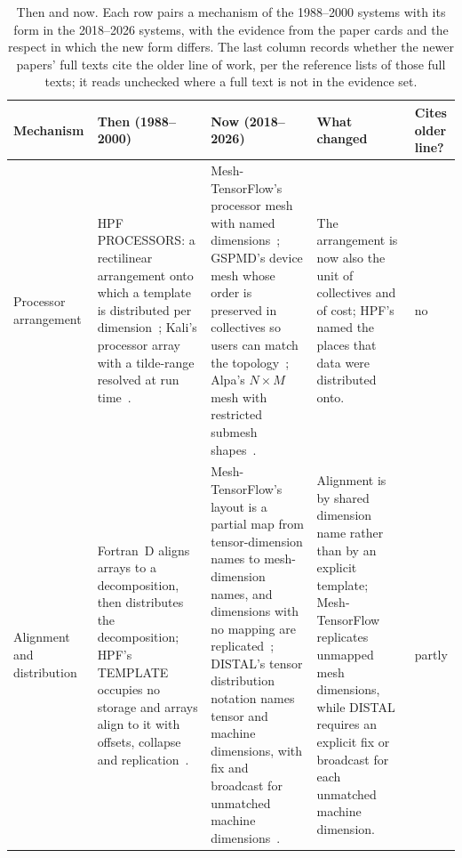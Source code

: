 \begin{table}[t]
\centering
\scriptsize
\caption{Then and now. Each row pairs a mechanism of the 1988--2000 systems with its form in the 2018--2026 systems, with the evidence from the paper cards and the respect in which the new form differs. The last column records whether the newer papers' full texts cite the older line of work, per the reference lists of those full texts; it reads unchecked where a full text is not in the evidence set.}
\label{tab:thennow}
\begin{tabular}{p{}p{}p{}p{}p{}}
\toprule
Mechanism & Then (1988--2000) & Now (2018--2026) & What changed & Cites older line? \\
\midrule
Processor arrangement & HPF PROCESSORS: a rectilinear arrangement onto which a template is distributed per dimension~\cite{loveman1993hpf}; Kali's processor array with a tilde-range resolved at run time~\cite{mehrotra1990kali}. & Mesh-TensorFlow's processor mesh with named dimensions~\cite{shazeer2018meshtf}; GSPMD's device mesh whose order is preserved in collectives so users can match the topology~\cite{xu2021gspmd}; Alpa's $N{\times}M$ mesh with restricted submesh shapes~\cite{zheng2022alpa}. & The arrangement is now also the unit of collectives and of cost; HPF's named the places that data were distributed onto. & no \\
Alignment and distribution & Fortran~D aligns arrays to a decomposition, then distributes the decomposition; HPF's TEMPLATE occupies no storage and arrays align to it with offsets, collapse and replication~\cite{hiranandani1991fortrand,loveman1993hpf}. & Mesh-TensorFlow's layout is a partial map from tensor-dimension names to mesh-dimension names, and dimensions with no mapping are replicated~\cite{shazeer2018meshtf}; DISTAL's tensor distribution notation names tensor and machine dimensions, with fix and broadcast for unmatched machine dimensions~\cite{yadav2022distal}. & Alignment is by shared dimension name rather than by an explicit template; Mesh-TensorFlow replicates unmapped mesh dimensions, while DISTAL requires an explicit fix or broadcast for each unmatched machine dimension. & partly \\

\end{tabular}
\end{table}
